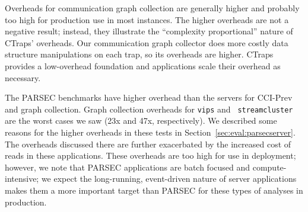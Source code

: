 \documentclass[10pt,nocopyrightspace]{sigplanconf}
\newcommand{\addtodo}[1]{\textcolor{red}{[To do: #1]}}
\newcommand{\ctraps}{CTraps\xspace}
\newcommand{\ctrapsmm}{CTraps-NRR\xspace}
\begin{document}
Overheads for communication graph collection are generally higher and probably
too high for production use in most instances.  The higher overheads are not a
negative result; instead, they illustrate the ``complexity proportional''
nature of \ctraps' overheads.  Our communication graph collector
does more costly data structure manipulations on each trap, so
its overheads are higher.  \ctraps provides a low-overhead foundation and
applications scale their overhead as necessary. 



The PARSEC benchmarks have higher overhead than the servers for CCI-Prev and
graph collection.  Graph collection overheads for {\tt vips} and {\tt
streamcluster} are the worst cases we saw (23x and 47x, respectively).  We
described some reasons for the higher overheads in these tests in
Section~\ref{sec:eval:parsecserver}.  The overheads discussed there are further
exacerbated by the increased cost of reads in these applications.  These
overheads are too high for use in deployment;  however, we note that PARSEC
applications are batch focused and compute-intensive; we expect the
long-running, event-driven nature of server applications makes them a more
important target than PARSEC for these types of analyses in production.  




\end{document}
